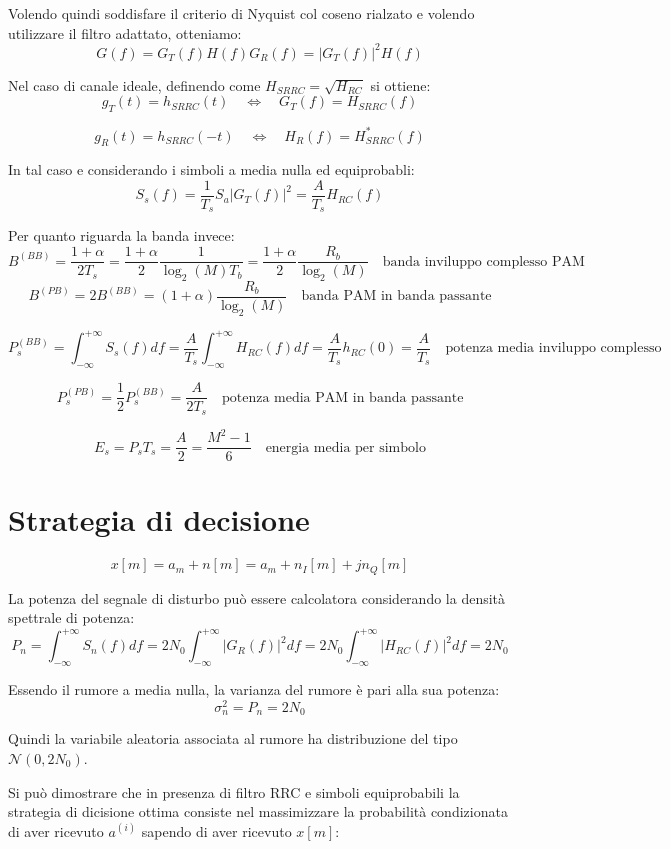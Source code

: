 Volendo quindi soddisfare il criterio di Nyquist col coseno rialzato e volendo utilizzare il filtro adattato, otteniamo:
\[
    G(f) = G_T(f) H(f) G_R(f) = |G_T(f)|^2 H(f)
\]

Nel caso di canale ideale, definendo come $H_{SRRC} = \sqrt{H_{RC}}$ si ottiene:
\[
    g_T(t) = h_{SRRC}(t) \quad \Longleftrightarrow \quad G_T(f) = H_{SRRC}(f) 
\]

\[
    g_R(t) = h_{SRRC}(-t) \quad \Longleftrightarrow \quad H_R(f) = H_{SRRC}^*(f)
\]


In tal caso e considerando i simboli a media nulla ed equiprobabli: 
\[
    S_s(f) = \frac{1}{T_s} S_a |G_T(f)|^2 = \frac{A}{T_s} H_{RC}(f)
\]


Per quanto riguarda la banda invece:
\[
    B^{(BB)} = \frac{1+\alpha}{2T_s} = \frac{1+\alpha}{2} \frac{1}{\log_2(M) T_b} = \frac{1+\alpha}{2} \frac{R_b}{\log_2(M)} \quad \text{banda inviluppo complesso PAM}
\]
\[
    B^{(PB)} = 2 B^{(BB)} = (1+\alpha) \frac{R_b}{\log_2(M)} \quad \text{banda PAM in banda passante}
\]

\[
    P_s^{(BB)} = \int_{-\infty}^{+\infty} S_s(f) df = \frac{A}{T_s} \int_{-\infty}^{+\infty} H_{RC}(f) df = \frac{A}{T_s} h_{RC}(0) = \frac{A}{T_s} \quad \text{potenza media inviluppo complesso}
\]

\[
    P_s^{(PB)} = \frac{1}{2} P_s^{(BB)} = \frac{A}{2T_s} \quad \text{potenza media PAM in banda passante}
\]

\[
    E_s = P_s T_s = \frac{A}{2} = \frac{M^2 - 1}{6} \quad \text{energia media per simbolo}
\]


\section*{Strategia di decisione}


\[
    x[m] = a_m + n[m] = a_m + n_I[m] + jn_Q[m]
\]  

La potenza del segnale di disturbo può essere calcolatora considerando la densità spettrale di potenza:
\[
    P_n = \int_{-\infty}^{+\infty} S_n(f) df = 2N_0 \int_{-\infty}^{+\infty} |G_R(f)|^2 df = 2N_0 \int_{-\infty}^{+\infty} |H_{RC}(f)|^2 df = 2N_0
\]

Essendo il rumore a media nulla, la varianza del rumore è pari alla sua potenza:
\[
    \sigma_n^2 = P_n = 2N_0
\]

Quindi la variabile aleatoria associata al rumore ha distribuzione del tipo $\mathcal{N}(0, 2 N_0)$.

Si può dimostrare che in presenza di filtro RRC e simboli equiprobabili la strategia di dicisione ottima consiste nel massimizzare la probabilità condizionata di aver ricevuto $a^{(i)}$ sapendo di aver ricevuto $x[m]$:

